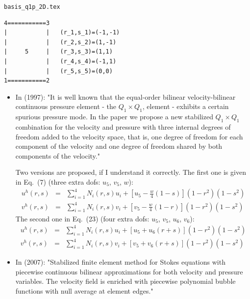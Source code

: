 \begin{flushright} {\tiny {\color{gray} \tt basis\_q1p\_2D.tex}} \end{flushright}

\begin{verbatim}
4===========3
|           |   (r_1,s_1)=(-1,-1)
|           |   (r_2,s_2)=(1,-1)
|     5     |   (r_3,s_3)=(1,1)
|           |   (r_4,s_4)=(-1,1)
|           |   (r_5,s_5)=(0,0)
1===========2
\end{verbatim}

\begin{itemize}
\item 
In \textcite{bai97} (1997): "It is well known that the equal-order bilinear velocity-bilinear 
continuous pressure element - the $Q_1\times Q_1$, element - exhibits a certain spurious pressure mode.
In the paper we propose a new stabilized $Q_1\times Q_1$ combination for the velocity and
pressure with three internal degrees of freedom added to the velocity space, that is, one degree of
freedom for each component of the velocity and one degree of freedom shared by both components of
the velocity."

Two versions are proposed, if I understand it correctly.
The first one is given in Eq.~(7) (three extra dofs: $u_5$, $v_5$, $w$):
\begin{eqnarray}
u^h(r,s) &=& \sum_{i=1}^4 N_i (r,s) u_i + \left[ u_5 - \frac{w}{4}(1-s) \right] (1-r^2)(1-s^2) \nonumber\\
v^h(r,s) &=& \sum_{i=1}^4 N_i (r,s) v_i + \left[ v_5 - \frac{w}{4}(1-r) \right] (1-r^2)(1-s^2) 
\end{eqnarray}
The second one in Eq.~(23) (four extra dofs: $u_5$, $v_5$, $u_6$, $v_6$):
\begin{eqnarray}
u^h(r,s) &=& \sum_{i=1}^4 N_i (r,s) u_i + \left[ u_5 +u_6(r+s) \right] (1-r^2)(1-s^2) \nonumber\\
v^h(r,s) &=& \sum_{i=1}^4 N_i (r,s) v_i + \left[ v_5 +v_6(r+s) \right] (1-r^2)(1-s^2) 
\end{eqnarray}

\item In \textcite{fros07} (2007): 
"Stabilized finite element method for Stokes equations with piecewise continuous 
bilinear approximations for both velocity and pressure variables. The velocity
field is enriched with piecewise polynomial bubble functions with null average at element
edges."


\end{itemize}
